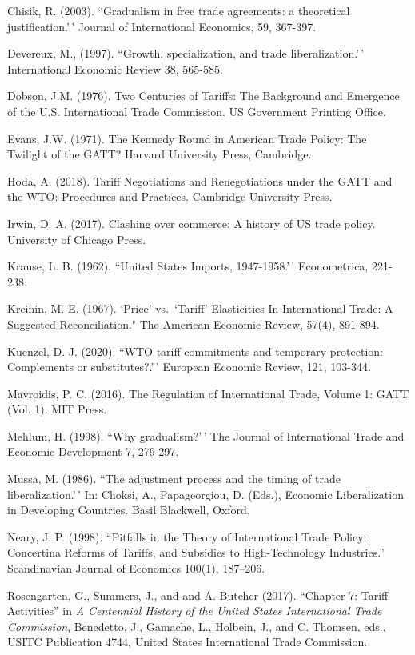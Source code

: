 \documentclass[
  12pt,
]{article}
\begin{document}
Chisik, R. (2003). ``Gradualism in free trade agreements: a theoretical justification.'\,' Journal of International Economics, 59, 367-397.

Devereux, M., (1997). ``Growth, specialization, and trade liberalization.'\,' International Economic Review
38, 565-585.

Dobson, J.M. (1976). Two Centuries of Tariffs: The Background and Emergence of the U.S. International Trade Commission. US Government Printing Office.

Evans, J.W. (1971). The Kennedy Round in American Trade Policy: The Twilight of the GATT? Harvard University Press, Cambridge.

Hoda, A. (2018). Tariff Negotiations and Renegotiations under the GATT and the WTO: Procedures and Practices. Cambridge University Press.

Irwin, D. A. (2017). Clashing over commerce: A history of US trade policy. University of Chicago Press.

Krause, L. B. (1962). ``United States Imports, 1947-1958.'\,' Econometrica, 221-238.

Kreinin, M. E. (1967). `\texttt{}Price' vs.~`Tariff' Elasticities In International Trade: A Suggested Reconciliation." The American Economic Review, 57(4), 891-894.

Kuenzel, D. J. (2020). ``WTO tariff commitments and temporary protection: Complements or substitutes?.'\,' European Economic Review, 121, 103-344.

Mavroidis, P. C. (2016). The Regulation of International Trade, Volume 1: GATT (Vol. 1). MIT Press.

Mehlum, H. (1998). ``Why gradualism?'\,' The Journal of International Trade and Economic Development 7, 279-297.

Mussa, M. (1986). ``The adjustment process and the timing of trade liberalization.'\,' In: Choksi, A., Papageorgiou, D. (Eds.), Economic Liberalization in Developing Countries. Basil Blackwell, Oxford.

Neary, J. P. (1998). ``Pitfalls in the Theory of International Trade Policy: Concertina Reforms
of Tariffs, and Subsidies to High-Technology Industries.'' Scandinavian Journal of Economics 100(1), 187--206.

Rosengarten, G., Summers, J., and and A. Butcher (2017). ``Chapter 7: Tariff Activities'' in \emph{A Centennial History of the United States International Trade Commission}, Benedetto, J., Gamache, L., Holbein, J., and C. Thomsen, eds., USITC Publication 4744, United States International Trade Commission.
\end{document}
